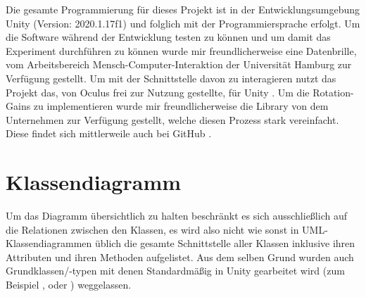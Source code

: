 Die gesamte Programmierung für dieses Projekt ist in der Entwicklungsumgebung Unity (Version: 2020.1.17f1) \cite{unity} und folglich mit der Programmiersprache  erfolgt. Um die Software während der Entwicklung testen zu können und um damit das Experiment durchführen zu können wurde mir freundlicherweise eine  \cite{quest} Datenbrille, vom Arbeitsbereich Mensch-Computer-Interaktion der Universität Hamburg zur Verfügung gestellt. Um mit der Schnittstelle davon zu interagieren nutzt das Projekt das, von Oculus frei zur Nutzung gestellte,  für Unity \cite{integration}. Um die Rotation-Gains zu implementieren wurde mir freundlicherweise die Library  von dem Unternehmen  zur Verfügung gestellt, welche diesen Prozess stark vereinfacht. Diese findet sich mittlerweile auch bei GitHub \cite{space-extender-git}.

\section{Klassendiagramm}
Um das Diagramm übersichtlich zu halten beschränkt es sich ausschließlich auf die Relationen zwischen den Klassen, es wird also nicht wie sonst in UML-Klassendiagrammen üblich die gesamte Schnittstelle aller Klassen inklusive ihren Attributen und ihren Methoden aufgelistet.
Aus dem selben Grund wurden auch Grundklassen/-typen mit denen Standardmäßig in Unity gearbeitet wird (zum Beispiel ,  oder ) weggelassen.

